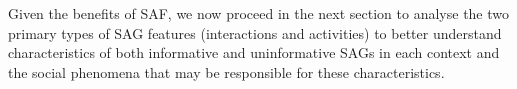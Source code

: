 Given the benefits of SAF, we now proceed in the
next section to analyse the two primary types of SAG features
(interactions and activities) to better understand characteristics of
both informative and uninformative SAGs in each context and the social
phenomena that may be responsible for these characteristics.